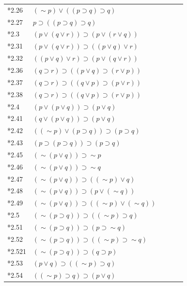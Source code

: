 \documentclass[journal]{IEEEtran}
\begin{document}
\begin{table}[h]
\begin{tabular}{lllll}
*2.26 & $ (\sim p) \vee ((p \supset q) \supset q) $ & \Y & \ & \Y \\
*2.27 & $p \supset ((p \supset q) \supset q) $ & \Y & \ & \Y \\
*2.3 & $(p \vee (q \vee r)) \supset (p \vee (r \vee q)) $ & \Y & \ & \Y \\
*2.31 & $(p \vee (q \vee r)) \supset ((p \vee q) \vee r) $ & \N & \N \cite[p.~220]{LT1957} & \N \\
*2.32 & $((p \vee q) \vee r) \supset (p \vee (q \vee r)) $ & \N & \ & \N \\
*2.36 & $(q \supset r) \supset ((p \vee q) \supset (r \vee p)) $ & \N & \ & \N \\
*2.37 & $(q \supset r) \supset ((q \vee p) \supset (p \vee r)) $ & \N & \ & \N \\
*2.38 & $(q \supset r) \supset ((q \vee p) \supset (r \vee p)) $ & \Y & \ & \N \\
*2.4 & $(p \vee (p \vee q)) \supset (p \vee q) $ & \N & \ & \N \\
*2.41 & $(q \vee (p \vee q)) \supset (p \vee q) $ & \N & \ & \N \\
*2.42 & $(( \sim p) \vee (p \supset q)) \supset (p \supset q) $ & \Y & \ & \N \\
*2.43 & $(p \supset (p \supset q)) \supset (p \supset q) $ & \Y & \ & \Y \\
*2.45 & $ (\sim (p \vee q)) \supset \sim p $ & \Y & \Y \cite[p.~219]{LT1957} & \Y \\
*2.46 & $ (\sim (p \vee q)) \supset \sim q $ & \Y & \ & \Y \\
*2.47 & $ (\sim (p \vee q)) \supset ( (\sim p) \vee q) $ & \Y & \ & \Y \\
*2.48 & $ (\sim (p \vee q)) \supset (p \vee (\sim q)) $ & \Y & \Y \cite[p.~229]{LT1957} & \Y \\
*2.49 & $ (\sim (p \vee q)) \supset ( (\sim p) \vee (\sim q)) $ & \Y & \ & \Y \\
*2.5 & $ (\sim (p \supset q)) \supset ( (\sim p) \supset q) $ & \Y & \ & \Y \\
*2.51 & $ (\sim (p \supset q)) \supset (p \supset \sim q) $ & \Y & \ & \Y \\
*2.52 & $ (\sim (p \supset q)) \supset ( (\sim p) \supset \sim q)$ & \Y & \ & \Y \\
*2.521 & $ (\sim (p \supset q)) \supset (q \supset p) $ & \Y & \ & \Y \\
*2.53 & $(p \vee q) \supset ( (\sim p) \supset q) $ & \Y & \ & \N \\
*2.54 & $( (\sim p )\supset q) \supset (p \vee q) $ & \Y & \ & \N \\

\end{tabular}
\end{table}
\end{document}
